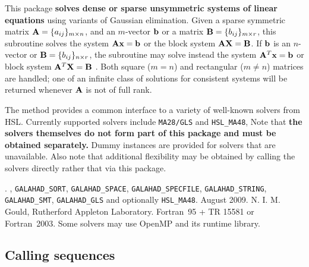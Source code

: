\documentclass{galahad}
\newcommand{\packagename}{ULS}
\newcommand{\fullpackagename}{\libraryname\_\-\packagename}
\begin{document}
\galheader


\galsummary

This package 
{\bf solves dense or sparse unsymmetric systems of linear equations} 
using variants of Gaussian elimination.
Given a sparse symmetric matrix ${\mathbf{A}} = \{ a_{ij} \}_{m \times n}$, and an 
$m$-vector ${\mathbf{b}}$ or a matrix ${\mathbf{B}} = \{ b_{ij} \}_{m \times r}$, this
subroutine solves the system ${\mathbf{A}} {\mathbf{x}} = {\mathbf{b}}$ 
or the block system ${\mathbf{A}} {\mathbf{X}} = {\mathbf{B}}$. If 
${\mathbf{b}}$ is an $n$-vector or  ${\mathbf{B}} = \{ b_{ij} \}_{n \times r}$, 
the subroutine may solve instead the system ${\mathbf{A}}^T {\mathbf{x}} = {\mathbf{b}}$ 
or block system  ${\mathbf{A}}^T {\mathbf{X}} = {\mathbf{B}}$ . Both square ($m=n$) and
rectangular ($m\neq n$)  matrices are handled; one of an infinite
class of  solutions for consistent systems will be returned 
whenever ${\mathbf{A}}$ is not of full rank.
  
\noindent The method provides a common interface to a variety of well-known
solvers from HSL.
Currently supported solvers include
{\tt MA28/GLS} and {\tt HSL\_MA48}, 
Note that
{\bf the solvers themselves do not form part of this package and must be obtained 
separately.} Dummy instances are provided for solvers that are unavailable.
Also note that additional flexibility may be obtained by calling the
solvers directly rather that via this package.


\galattributes
\galversions{\tt  \fullpackagename\_single, \fullpackagename\_double}.
,
{\tt GALAHAD\_\-SORT},
{\tt GALAHAD\_SPACE},
{\tt GALAHAD\_SPECFILE},
{\tt GALAHAD\_STRING},
{\tt GALAHAD\_SMT},
{\tt GALAHAD\_GLS}
and optionally
{\tt HSL\_\-MA48}.
\galdate August 2009.
\galorigin N. I. M. Gould, Rutherford Appleton Laboratory.
\gallanguage Fortran~95 + TR 15581 or Fortran~2003. 
\galparallelism Some solvers may use OpenMP and its runtime library.


\galhowto

\subsection{Calling sequences}
\end{document}
